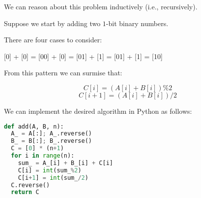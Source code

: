 \documentclass[a4paper,12pt]{article}
\begin{document}
We can reason about this problem inductively (i.e., recursively). 

\vspace{2mm}
Suppose we start by adding two $1$-bit binary numbers. 

\vspace{2mm}
There are four cases to consider:

\vspace{2mm}
[0] + [0] = [00] \newline  \indent
[1] + [0] = [01] \newline \indent
[0] + [1] = [01] \newline \indent
[1] + [1] = [10] 

\vspace{2mm}
From this pattern we can surmise that:

\[ C[i] = (A[i] + B[i]) \% 2 \] 
\[ C[i+1] = (A[i] + B[i]) / 2 \]

We can implement the desired algorithm in Python as follows:

\vspace{3mm}
\begin{lstlisting}[language=Python]
def add(A, B, n):
  A_ = A[:]; A_.reverse()
  B_ = B[:]; B_.reverse()
  C = [0] * (n+1)
  for i in range(n):
    sum_ = A_[i] + B_[i] + C[i]
    C[i] = int(sum_%2)
    C[i+1] = int(sum_/2)
  C.reverse()
  return C
\end{lstlisting}
\end{document}
